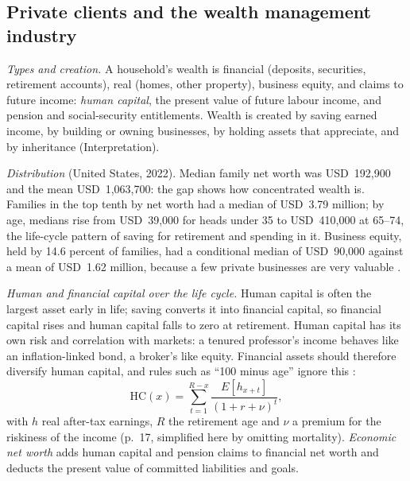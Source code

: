 \subsection{Private clients and the wealth management industry}

\begin{qfmethod}\label{meth:individual-wealth-capital}
 \emph{Types and creation.} A household's wealth is financial (deposits, securities, retirement accounts), real (homes, other property), business equity, and claims to future income: \emph{human capital}, the present value of future labour income, and pension and social-security entitlements. Wealth is created by saving earned income, by building or owning businesses, by holding assets that appreciate, and by inheritance (Interpretation).

\emph{Distribution} (United States, 2022). Median family net worth was USD~192,900 and the mean USD~1,063,700: the gap shows how concentrated wealth is. Families in the top tenth by net worth had a median of USD~3.79 million; by age, medians rise from USD~39,000 for heads under 35 to USD~410,000 at 65--74, the life-cycle pattern of saving for retirement and spending in it. Business equity, held by 14.6 percent of families, had a conditional median of USD~90,000 against a mean of USD~1.62 million, because a few private businesses are very valuable \citep[pp.~11--13, 20]{fed-scf-2022}.

\emph{Human and financial capital over the life cycle.} Human capital is often the largest asset early in life; saving converts it into financial capital, so financial capital rises and human capital falls to zero at retirement. Human capital has its own risk and correlation with markets: a tenured professor's income behaves like an inflation-linked bond, a broker's like equity. Financial assets should therefore diversify human capital, and rules such as ``100 minus age'' ignore this \citep[pp.~13--16, 74--76]{ibbotson-lifetime-financial-advice-2007}:
\[ \mathrm{HC}(x)=\sum_{t=1}^{R-x}\frac{E[h_{x+t}]}{(1+r+\nu)^{t}}, \]
with $h$ real after-tax earnings, $R$ the retirement age and $\nu$ a premium for the riskiness of the income (p.~17, simplified here by omitting mortality). \emph{Economic net worth} adds human capital and pension claims to financial net worth and deducts the present value of committed liabilities and goals.


\end{qfmethod}
